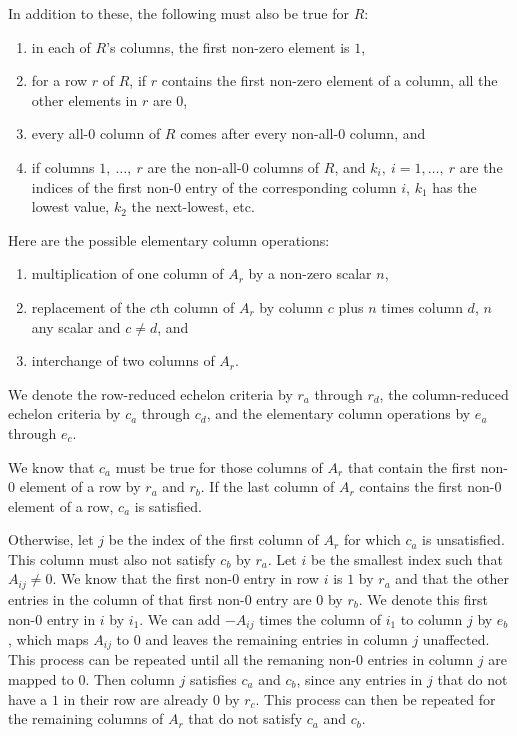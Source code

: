 \documentclass[12pt]{article}
\begin{document}
\begin{enumerate}
    In addition to these, the following must also be true for
    $R$:

    \begin{enumerate}
      \item
        in each of $R$'s columns, the first non-zero element is
        $1$,
      \item
        for a row $r$ of $R$, if $r$ contains the first non-zero
        element of a column, all the other elements in $r$ are
        $0$,
      \item
        every all-0 column of $R$ comes after every non-all-0
        column, and
      \item
        if columns $1,\ \ldots,\ r$ are the non-all-0 columns of
        $R$, and $k_i,\ i = 1, \ldots,\ r$ are the indices of the
        first non-0 entry of the corresponding column $i$, $k_1$
        has the lowest value, $k_2$ the next-lowest, etc.
    \end{enumerate}

    Here are the possible elementary column operations:

    \begin{enumerate}
        \item
          multiplication of one column of $A_r$ by a non-zero
          scalar $n$,
        \item
          replacement of the $c$th column of $A_r$ by column $c$
          plus $n$ times column $d$, $n$ any scalar and $c \neq
          d$, and
        \item
          interchange of two columns of $A_r$.
    \end{enumerate}

    We denote the row-reduced echelon criteria by $r_a$ through
    $r_d$, the column-reduced echelon criteria by $c_a$ through
    $c_d$, and the elementary column operations by $e_a$ through
    $e_c$.

    We know that $c_a$ must be true for those columns of $A_r$
    that contain the first non-0 element of a row by $r_a$ and
    $r_b$. If the last column of $A_r$ contains the first non-0
    element of a row, $c_a$ is satisfied.

    Otherwise, let $j$ be the index of the first column of $A_r$
    for which $c_a$ is unsatisfied. This column must also not
    satisfy $c_b$ by $r_a$. Let $i$ be the smallest index such
    that $A_{ij} \neq 0$. We know that the first non-0 entry in
    row $i$ is $1$ by $r_a$ and that the other entries in the
    column of that first non-0 entry are $0$ by $r_b$. We denote
    this first non-0 entry in $i$ by $i_1$.  We can add $-A_{ij}$
    times the column of $i_1$ to column $j$ by $e_b$, which maps
    $A_{ij}$ to $0$ and leaves the remaining entries in column
    $j$ unaffected. This process can be repeated until all the
    remaning non-0 entries in column $j$ are mapped to $0$. Then
    column $j$ satisfies $c_a$ and $c_b$, since any entries in
    $j$ that do not have a $1$ in their row are already $0$ by
    $r_c$. This process can then be repeated for the remaining
    columns of $A_r$ that do not satisfy $c_a$ and $c_b$.


\end{enumerate}
\end{document}
